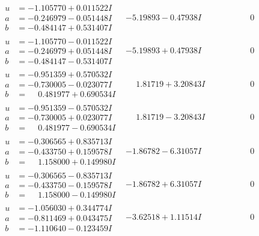 \documentclass[1p]{elsarticle_modified}
\theoremstyle{definition}
\begin{document}
$$\begin{array}{c|c|c}
\begin{aligned}
u &= -1.105770 + 0.011522 I \\
a &= -0.246979 - 0.051448 I \\
b &= -0.484147 + 0.531407 I\end{aligned}
 & -5.19893 - 0.47938 I & \phantom{-0.000000 } 0 \\ \hline\begin{aligned}
u &= -1.105770 - 0.011522 I \\
a &= -0.246979 + 0.051448 I \\
b &= -0.484147 - 0.531407 I\end{aligned}
 & -5.19893 + 0.47938 I & \phantom{-0.000000 } 0 \\ \hline\begin{aligned}
u &= -0.951359 + 0.570532 I \\
a &= -0.730005 - 0.023077 I \\
b &= \phantom{-}0.481977 + 0.690534 I\end{aligned}
 & \phantom{-}1.81719 + 3.20843 I & \phantom{-0.000000 } 0 \\ \hline\begin{aligned}
u &= -0.951359 - 0.570532 I \\
a &= -0.730005 + 0.023077 I \\
b &= \phantom{-}0.481977 - 0.690534 I\end{aligned}
 & \phantom{-}1.81719 - 3.20843 I & \phantom{-0.000000 } 0 \\ \hline\begin{aligned}
u &= -0.306565 + 0.835713 I \\
a &= -0.433750 + 0.159578 I \\
b &= \phantom{-}1.158000 + 0.149980 I\end{aligned}
 & -1.86782 - 6.31057 I & \phantom{-0.000000 } 0 \\ \hline\begin{aligned}
u &= -0.306565 - 0.835713 I \\
a &= -0.433750 - 0.159578 I \\
b &= \phantom{-}1.158000 - 0.149980 I\end{aligned}
 & -1.86782 + 6.31057 I & \phantom{-0.000000 } 0 \\ \hline\begin{aligned}
u &= -1.056030 + 0.344774 I \\
a &= -0.811469 + 0.043475 I \\
b &= -1.110640 - 0.123459 I\end{aligned}
 & -3.62518 + 1.11514 I & \phantom{-0.000000 } 0 \\ \hline\begin{aligned}

\end{aligned}
\end{array}$$
\end{document}
